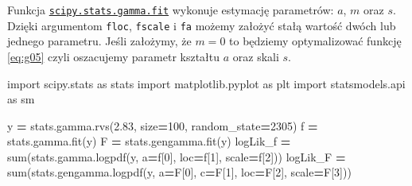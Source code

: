\documentclass[polish,]{book}
\newenvironment{Shaded}{\begin{snugshade}}{\end{snugshade}}
\newcommand{\BuiltInTok}[1]{#1}
\newcommand{\DecValTok}[1]{\textcolor[rgb]{0.00,0.00,0.81}{#1}}
\newcommand{\FloatTok}[1]{\textcolor[rgb]{0.00,0.00,0.81}{#1}}
\newcommand{\ImportTok}[1]{#1}
\newcommand{\NormalTok}[1]{#1}
\newcommand{\OperatorTok}[1]{\textcolor[rgb]{0.81,0.36,0.00}{\textbf{#1}}}
\begin{document}
Funkcja \href{https://docs.scipy.org/doc/scipy/reference/generated/scipy.stats.gamma.html\#scipy.stats.gamma}{\texttt{scipy.stats.gamma.fit}} wykonuje estymację parametrów: \(a\), \(m\) oraz \(s\). Dzięki argumentom \texttt{floc}, \texttt{fscale} i \texttt{fa} możemy założyć stałą wartość dwóch lub jednego parametru. Jeśli założymy, że \(m=0\) to będziemy optymalizować funkcję \eqref{eq:g05} czyli oszacujemy parametr kształtu \(a\) oraz skali \(s\).

\begin{Shaded}
\begin{Highlighting}[]
\ImportTok{import}\NormalTok{ scipy.stats }\ImportTok{as}\NormalTok{ stats}
\ImportTok{import}\NormalTok{ matplotlib.pyplot }\ImportTok{as}\NormalTok{ plt}
\ImportTok{import}\NormalTok{ statsmodels.api }\ImportTok{as}\NormalTok{ sm}

\NormalTok{y }\OperatorTok{=}\NormalTok{ stats.gamma.rvs(}\FloatTok{2.83}\NormalTok{, size}\OperatorTok{=}\DecValTok{100}\NormalTok{, random_state}\OperatorTok{=}\DecValTok{2305}\NormalTok{)}
\NormalTok{f }\OperatorTok{=}\NormalTok{ stats.gamma.fit(y)}
\NormalTok{F }\OperatorTok{=}\NormalTok{ stats.gengamma.fit(y)}
\NormalTok{logLik_f }\OperatorTok{=} \BuiltInTok{sum}\NormalTok{(stats.gamma.logpdf(y, a}\OperatorTok{=}\NormalTok{f[}\DecValTok{0}\NormalTok{], loc}\OperatorTok{=}\NormalTok{f[}\DecValTok{1}\NormalTok{], scale}\OperatorTok{=}\NormalTok{f[}\DecValTok{2}\NormalTok{]))}
\NormalTok{logLik_F }\OperatorTok{=} \BuiltInTok{sum}\NormalTok{(stats.gengamma.logpdf(y, a}\OperatorTok{=}\NormalTok{F[}\DecValTok{0}\NormalTok{], c}\OperatorTok{=}\NormalTok{F[}\DecValTok{1}\NormalTok{], loc}\OperatorTok{=}\NormalTok{F[}\DecValTok{2}\NormalTok{], scale}\OperatorTok{=}\NormalTok{F[}\DecValTok{3}\NormalTok{]))}
    

\end{Highlighting}
\end{Shaded}
\end{document}
